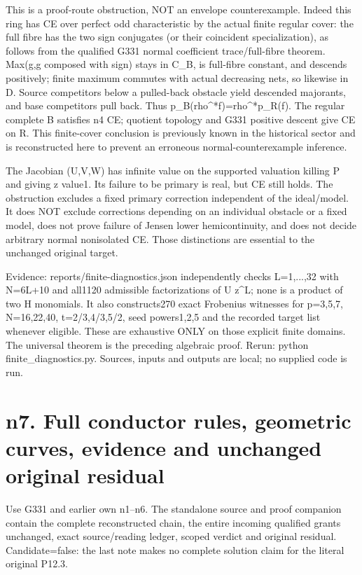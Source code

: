 \documentclass[11pt]{article}
\begin{document}
This is a proof-route obstruction, NOT an envelope counterexample. Indeed this ring has CE over perfect odd characteristic by the actual finite regular cover: the full fibre has the two sign conjugates (or their coincident specialization), as follows from the qualified G331 normal coefficient trace/full-fibre theorem. Max(g,g composed with sign) stays in C\_B, is full-fibre constant, and descends positively; finite maximum commutes with actual decreasing nets, so likewise in D. Source competitors below a pulled-back obstacle yield descended majorants, and base competitors pull back. Thus p\_B(rho\textasciicircum{}*f)=rho\textasciicircum{}*p\_R(f). The regular complete B satisfies n4 CE; quotient topology and G331 positive descent give CE on R. This finite-cover conclusion is previously known in the historical sector and is reconstructed here to prevent an erroneous normal-counterexample inference.

The Jacobian (U,V,W) has infinite value on the supported valuation killing P and giving z value1. Its failure to be primary is real, but CE still holds. The obstruction excludes a fixed primary correction independent of the ideal/model. It does NOT exclude corrections depending on an individual obstacle or a fixed model, does not prove failure of Jensen lower hemicontinuity, and does not decide arbitrary normal nonisolated CE. Those distinctions are essential to the unchanged original target.

Evidence: reports/finite-diagnostics.json independently checks L=1,...,32 with N=6L+10 and all1120 admissible factorizations of U z\textasciicircum{}L; none is a product of two H monomials. It also constructs270 exact Frobenius witnesses for p=3,5,7, N=16,22,40, t=2/3,4/3,5/2, seed powers1,2,5 and the recorded target list whenever eligible. These are exhaustive ONLY on those explicit finite domains. The universal theorem is the preceding algebraic proof. Rerun: python finite\_diagnostics.py. Sources, inputs and outputs are local; no supplied code is run.

\section{n7. Full conductor rules, geometric curves, evidence and unchanged original residual}

Use G331 and earlier own n1--n6. The standalone source and proof companion contain the complete reconstructed chain, the entire incoming qualified grants unchanged, exact source/reading ledger, scoped verdict and original residual. Candidate=false: the last note makes no complete solution claim for the literal original P12.3.
\end{document}
